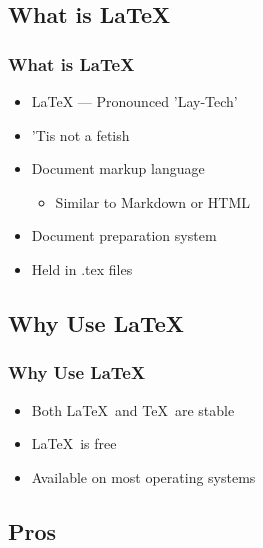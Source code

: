 \subsection{What is \LaTeX}

\begin{frame}
\frametitle{What is \LaTeX}
    \begin{itemize}
        \item \LaTeX{} --- Pronounced 'Lay-Tech'
        \item 'Tis not a fetish
        \item Document markup language
        \begin{itemize}
            \item Similar to Markdown or HTML
        \end{itemize}
        \item Document preparation system
        \item Held in .tex files
    \end{itemize}
\end{frame}

\subsection{Why Use \LaTeX}

\begin{frame}
\frametitle{Why Use \LaTeX}
    \begin{itemize}
        \item Both \LaTeX\ and \TeX\ are stable
        \item \LaTeX\ is free
        \item Available on most operating systems
    \end{itemize}
\end{frame}



\subsection{Pros}


